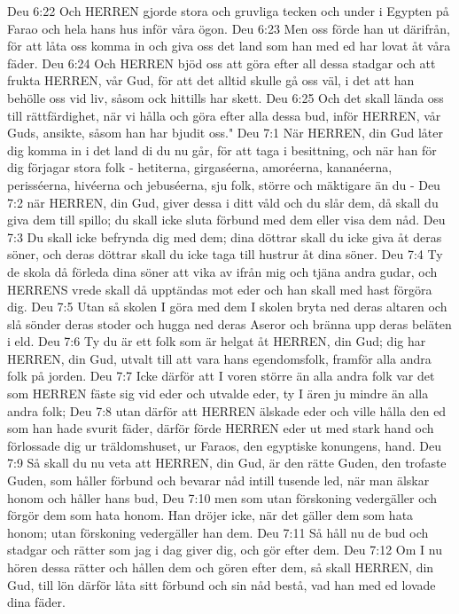 Deu 6:22  Och HERREN gjorde stora och gruvliga tecken och under i Egypten på Farao och hela hans hus inför våra ögon.
Deu 6:23  Men oss förde han ut därifrån, för att låta oss komma in och giva oss det land som han med ed har lovat åt våra fäder.
Deu 6:24  Och HERREN bjöd oss att göra efter all dessa stadgar och att frukta HERREN, vår Gud, för att det alltid skulle gå oss väl, i det att han behölle oss vid liv, såsom ock hittills har skett.
Deu 6:25  Och det skall lända oss till rättfärdighet, när vi hålla och göra efter alla dessa bud, inför HERREN, vår Guds, ansikte, såsom han har bjudit oss."
Deu 7:1  När HERREN, din Gud låter dig komma in i det land di du nu går, för att taga i besittning, och när han för dig förjagar stora folk - hetiterna, girgaséerna, amoréerna, kananéerna, perisséerna, hivéerna och jebuséerna, sju folk, större och mäktigare än du -
Deu 7:2  när HERREN, din Gud, giver dessa i ditt våld och du slår dem, då skall du giva dem till spillo; du skall icke sluta förbund med dem eller visa dem nåd.
Deu 7:3  Du skall icke befrynda dig med dem; dina döttrar skall du icke giva åt deras söner, och deras döttrar skall du icke taga till hustrur åt dina söner.
Deu 7:4  Ty de skola då förleda dina söner att vika av ifrån mig och tjäna andra gudar, och HERRENS vrede skall då upptändas mot eder och han skall med hast förgöra dig.
Deu 7:5  Utan så skolen I göra med dem I skolen bryta ned deras altaren och slå sönder deras stoder och hugga ned deras Aseror och bränna upp deras beläten i eld.
Deu 7:6  Ty du är ett folk som är helgat åt HERREN, din Gud; dig har HERREN, din Gud, utvalt till att vara hans egendomsfolk, framför alla andra folk på jorden.
Deu 7:7  Icke därför att I voren större än alla andra folk var det som HERREN fäste sig vid eder och utvalde eder, ty I ären ju mindre än alla andra folk;
Deu 7:8  utan därför att HERREN älskade eder och ville hålla den ed som han hade svurit fäder, därför förde HERREN eder ut med stark hand och förlossade dig ur träldomshuset, ur Faraos, den egyptiske konungens, hand.
Deu 7:9  Så skall du nu veta att HERREN, din Gud, är den rätte Guden, den trofaste Guden, som håller förbund och bevarar nåd intill tusende led, när man älskar honom och håller hans bud,
Deu 7:10  men som utan förskoning vedergäller och förgör dem som hata honom. Han dröjer icke, när det gäller dem som hata honom; utan förskoning vedergäller han dem.
Deu 7:11  Så håll nu de bud och stadgar och rätter som jag i dag giver dig, och gör efter dem.
Deu 7:12  Om I nu hören dessa rätter och hållen dem och gören efter dem, så skall HERREN, din Gud, till lön därför låta sitt förbund och sin nåd bestå, vad han med ed lovade dina fäder.
